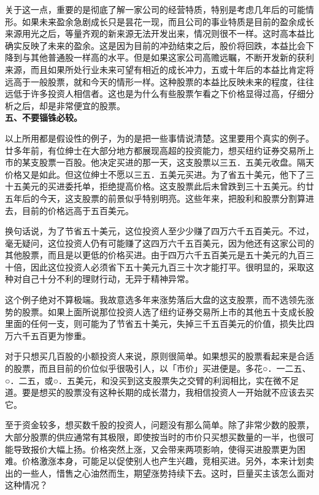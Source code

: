 \documentclass[UTF8,a4paper,zihao=-4,fontset = windows]{ctexart} %
\begin{document}
关于这一点，重要的是彻底了解一家公司的经营特质，特别是考虑几年后的可能情形。如果未来盈余急剧成长只是昙花一现，而且公司的事业特质是目前的盈余成长来源用光之后，等量齐观的新来源无法开发出来，情况则很不一样。这时高本益比确实反映了未来的盈余。这是因为目前的冲劲结束之后，股价将回跌，本益比会下降到与其他普通股一样高的水平。但是如果这家公司高赡远瞩，不断开发新的获利来源，而且如果所处行业未来可望有相近的成长冲力，五或十年后的本益比肯定将远高于一般股票，就和今天的情形一样。这种股票的本益比反映未来的程度，往往远低于许多投资人相信者。这也是为什么有些股票乍看之下价格显得过高，仔细分析之后，却是非常便宜的股票。
\\

\textbf{五、不要锱铢必较。}


以上所用都是假设性的例子，为的是把一些事情说清楚。这里要用个真实的例子。廿多年前，有位绅士在大部分地方都展现高超的投资能力，想买纽约证券交易所上市的某支股票一百股。他决定买进的那一天，这支股票以三五．五美元收盘。隔天价格又是如此。但这位绅士不愿以三五．五美元买进。为了省五十美元，他下了三十五美元的买进委托单，拒绝提高价格。这支股票此后未曾跌到三十五美元。约廿五年后的今天，这支股票的前景似乎特别明亮。这些年来，把股利和股票分割算进去，目前的价格远高于五百美元。

换句话说，为了节省五十美元，这位投资人至少少赚了四万六千五百美元。不过，毫无疑问，这位投资人仍有可能赚了这四万六千五百美元，因为他还有这家公司的其他股票，而且是以更低的价格买进。由于四万六千五百美元是五十美元的九百三十倍，因此这位投资人必须省下五十美元九百三十次才能打平。很明显的，采取这种对自己十分不利的理财行动，无异于精神异常。

这个例子绝对不算极端。我故意选多年来涨势落后大盘的这支股票，而不选领先涨势的股票。如果上面所说那位投资人选了纽约证券交易所上市的其他五十支成长股里面的任何一支，则可能为了节省五十美元，失掉三千五百美元的价值，损失比四万六千五百更为惨重。

对于只想买几百股的小额投资人来说，原则很简单。如果想买的股票看起来是合适的股票，而且目前的价位似乎很吸引人，以「市价」买进便是。多花○．一二五、○．二五，或○．五美元，和没买到这支股票失之交臂的利润相比，实在微不足道。要是想买的股票没有这种长期的成长潜力，我相信投资人一开始就不应该去买它。

至于资金较多，想买数千股的投资人，问题没有那么简单。除了非常少数的股票，大部分股票的供应通常有其极限，即使按当时的市价只买想买数量的一半，也很可能导致报价大幅上扬。价格突然上涨，又会带来两项影响，使得买进股票更为困难。价格激涨本身，可能足以促使别人也产生兴趣，竞相买进。另外，本来计划卖出的一些人，惜售之心油然而生，期望涨势持续下去。这时，巨量买主该怎么面对这种情况？
\end{document}
